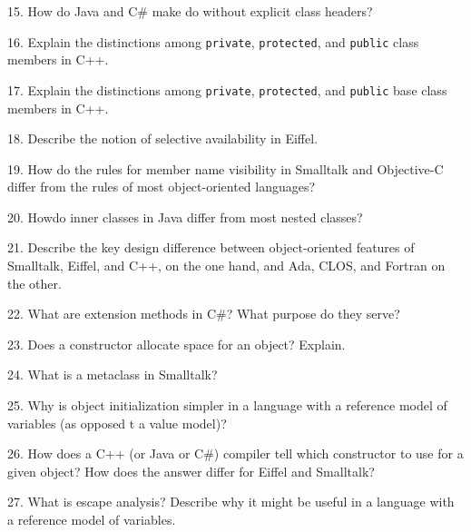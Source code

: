 \filbreak
\vskip 1cm

15. How do Java and C$\#$ make do without explicit class headers?

\filbreak
\vskip 1cm

16. Explain the distinctions among {\tt private}, {\tt protected}, and {\tt public} class members in C++.

\filbreak
\vskip 1cm

17. Explain the distinctions among {\tt private}, {\tt protected}, and {\tt public} base class members in C++.

\filbreak
\vskip 1cm

18. Describe the notion of selective availability in Eiffel.

\filbreak
\vskip 1cm

19.  How do the rules for member name visibility in Smalltalk and Objective-C differ from the rules of most object-oriented languages?

\filbreak
\vskip 1cm

20. Howdo inner classes in Java differ from most nested classes?

\filbreak
\vskip 1cm

21. Describe the key design difference between object-oriented features of Smalltalk, Eiffel, and C++, on the one hand, and Ada, CLOS, and Fortran on the other.

\filbreak
\vskip 1cm

22. What are extension methods in C$\#$? What purpose do they serve?

\filbreak
\vskip 1cm

23. Does a constructor allocate space for an object? Explain.

\filbreak
\vskip 1cm

24. What is a metaclass in Smalltalk?

\filbreak
\vskip 1cm
 
25. Why is object initialization simpler in a language with a reference model of variables (as opposed t a value model)?

\filbreak
\vskip 1cm

26. How does a C++ (or Java or C$\#$) compiler tell which constructor to use for a given object? How does the answer differ for Eiffel and Smalltalk?

\filbreak
\vskip 1cm

27. What is escape analysis? Describe why it might be useful in a language with a reference model of variables.

\filbreak
\vskip 1cm

